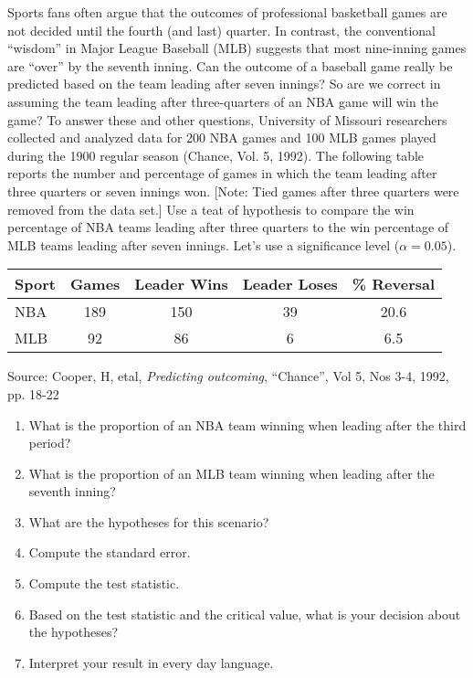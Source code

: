\documentclass[11pt]{book}\usepackage[]{graphicx}\usepackage[]{color}
\begin{document}
\begin{exercises}
\begin{exercise}
Sports fans often argue that the outcomes of professional basketball games are not decided until the fourth (and last) quarter. In contrast, the conventional ``wisdom'' in Major League Baseball (MLB) suggests that most nine-inning games are “over” by the seventh inning. Can the outcome of a baseball game really be predicted based on the team leading after seven innings? So are we correct in assuming the team leading after three-quarters of an NBA game will win the game? To answer these and other questions, University of Missouri researchers collected and analyzed data for 200 NBA games and 100 MLB games played during the 1900 regular season (Chance, Vol. 5, 1992). The following table reports the number and percentage of games in which the team leading after three quarters or seven innings won. [Note: Tied games after three quarters were removed from the data set.] Use a teat of hypothesis to compare the win percentage of NBA teams leading after three quarters to the win percentage of MLB teams leading after seven innings. Let’s use a significance level ($\alpha = 0.05$).

\begin{center}
\begin{tabular}{@{} lcccc @{}} \hline
Sport & Games & Leader Wins & Leader Loses & \% Reversal \\ \hline
NBA & 189 & 150 & 39 & 20.6 \\
MLB & 92  & 86  & 6 & 6.5   \\ \hline
\end{tabular}
\end{center}
\vspace{-1mm}
Source: Cooper, H, etal, \textit{Predicting outcoming}, ``Chance'', Vol 5, Nos 3-4, 1992, pp. 18-22

\begin{enumerate}
\item  What is the proportion of an NBA team winning when leading after the third period?
\item  What is the proportion of an MLB team winning when leading after the seventh inning?
\item  What are the hypotheses for this scenario?
\item  Compute the standard error.
\item  Compute the test statistic.
\item  Based on the test statistic and the critical value, what is your decision about the hypotheses?
\item  Interpret your result in every day language.
\end{enumerate}


\end{exercise}
\end{exercises}
\end{document}
